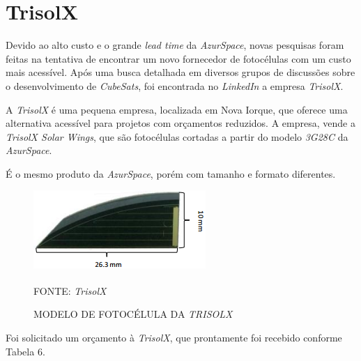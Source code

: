 \documentclass[
	12pt,				%
	openright,			%
	oneside,			%
	a4paper,			%
	english,			%
	french,				%
	spanish,			%
	brazil,				%
	oldfontcommands
	]{abntex2}
\begin{document}
\section[TrisolX]{TrisolX}	
	
	Devido ao alto custo e o grande \textit{lead time} da \textit{AzurSpace}, novas pesquisas foram feitas na tentativa de encontrar um novo fornecedor de fotocélulas com um custo mais acessível. Após uma busca detalhada em diversos grupos de discussões sobre o desenvolvimento de \textit{CubeSats}, foi encontrada no \textit{LinkedIn} a empresa \textit{TrisolX}.
	
	A \textit{TrisolX} é uma pequena empresa, localizada em Nova Iorque, que oferece uma alternativa acessível para projetos com orçamentos reduzidos. A empresa, vende a \textit{TrisolX Solar Wings}, que são fotocélulas cortadas a partir do modelo \textit{3G28C} da \textit{AzurSpace}.
	
	É o mesmo produto da \textit{AzurSpace}, porém com tamanho e formato diferentes.
	
	\begin{figure}[th]
		\caption{MODELO DE FOTOCÉLULA DA \textit{TRISOLX}}
		\centering
		\includegraphics[width=0.5\linewidth]{./figs/TrisolX}
			
		\begin{small}
			FONTE: \textit{TrisolX}\textsuperscript{\cite{TrisolX}}
		\end{small}		
	\end{figure}	
	\pagebreak
	Foi solicitado um orçamento à \textit{TrisolX}, que prontamente foi recebido conforme Tabela 6.
	
\end{document}
